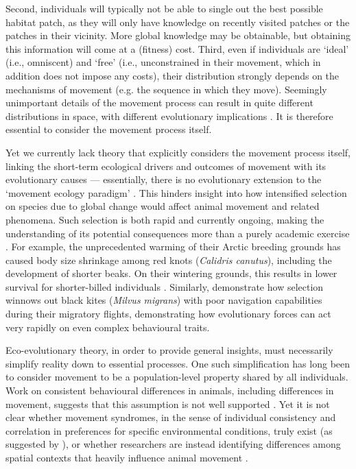 Second, individuals will typically not be able to single out the best possible habitat patch, as they will only have knowledge on recently visited patches or the patches in their vicinity. 
More global knowledge may be obtainable, but obtaining this information will come at a (fitness) cost. 
Third, even if individuals are `ideal' (i.e., omniscent) and `free' (i.e., unconstrained in their movement, which in addition does not impose any costs), their distribution strongly depends on the mechanisms of movement (e.g. the sequence in which they move). 
Seemingly unimportant details of the movement process can result in quite different distributions in space, with different evolutionary implications \parencite{houston1998a}. 
It is therefore essential to consider the movement process itself.

Yet we currently lack theory that explicitly considers the movement process itself, linking the short-term ecological drivers and outcomes of movement with its evolutionary causes --- essentially, there is no evolutionary extension to the `movement ecology paradigm' \citep{holyoak2008,nathan2008a}.
This hinders insight into how intensified selection on species due to global change would affect animal movement and related phenomena.
Such selection is both rapid and currently ongoing, making the understanding of its potential consequences more than a purely academic exercise \parencite{bonnet2022}.
For example, the unprecedented warming of their Arctic breeding grounds has caused body size shrinkage among red knots (\emph{Calidris canutus}), including the development of shorter beaks.
On their wintering grounds, this results in lower survival for shorter-billed individuals \citep[e.g.][]{vangils2016}.
Similarly, \textcite{sergio2022} demonstrate how selection winnows out black kites (\emph{Milvus migrans}) with poor navigation capabilities during their migratory flights, demonstrating how evolutionary forces can act very rapidly on even complex behavioural traits.

Eco-evolutionary theory, in order to provide general insights, must necessarily simplify reality down to essential processes.
One such simplification has long been to consider movement to be a population-level property shared by all individuals.
Work on consistent behavioural differences in animals, including differences in movement, suggests that this assumption is not well supported \citep{spiegel2017,shaw2020,stuber2022,webber2018,webber2020,abrahms2017}.
Yet it is not clear whether movement syndromes, in the sense of individual consistency and correlation in preferences for specific environmental conditions, truly exist (as suggested by \cite{stuber2022}), or whether researchers are instead identifying differences among spatial contexts that heavily influence animal movement \parencite{spiegel2022}.

